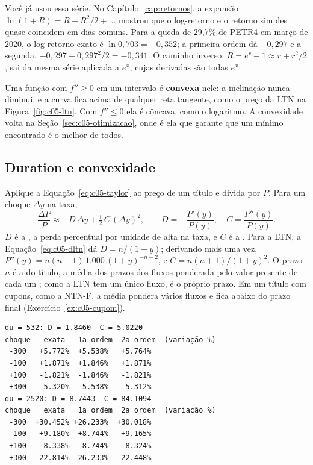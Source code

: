 Você já usou essa série. No Capítulo~\ref{cap:retornos}, a expansão $\ln(1+R) = R - R^2/2 + \dots$ mostrou que o log-retorno e o retorno simples quase coincidem em dias comuns. Para a queda de 29,7\% de PETR4 em março de 2020, o log-retorno exato é $\ln 0,703 = -0,352$; a primeira ordem dá $-0,297$ e a segunda, $-0,297 - 0,297^2/2 = -0,341$. O caminho inverso, $R = e^{r} - 1 \approx r + r^2/2$, sai da mesma série aplicada a $e^{x}$, cujas derivadas são todas $e^{x}$.

Uma função com $f'' \ge 0$ em um intervalo é \textbf{convexa} nele: a inclinação nunca diminui, e a curva fica acima de qualquer reta tangente, como o preço da LTN na Figura~\ref{fig:c05-ltn}. Com $f'' \le 0$ ela é côncava, como o logaritmo. A convexidade volta na Seção~\ref{sec:c05-otimizacao}, onde é ela que garante que um mínimo encontrado é o melhor de todos.

\subsection{Duration e convexidade}
\label{sec:c05-duration}

Aplique a Equação~\eqref{eq:c05-taylor} ao preço de um título e divida por $P$. Para um choque $\Delta y$ na taxa,
\begin{equation}
  \frac{\Delta P}{P} \approx -D\,\Delta y + \tfrac12\,C\,(\Delta y)^2 ,
  \qquad
  D = -\frac{P'(y)}{P(y)} , \quad C = \frac{P''(y)}{P(y)} .
  \label{eq:c05-dur-conv}
\end{equation}
$D$ é a , a perda percentual por unidade de alta na taxa, e $C$ é a . Para a LTN, a Equação~\eqref{eq:c05-dltn} dá $D = n/(1+y)$; derivando mais uma vez, $P''(y) = n(n+1)\,1.000\,(1+y)^{-n-2}$, e $C = n(n+1)/(1+y)^2$. O prazo $n$ é a  do título, a média dos prazos dos fluxos ponderada pelo valor presente de cada um \citep{macaulay1938}; como a LTN tem um único fluxo, é o próprio prazo. Em um título com cupons, como a NTN-F, a média pondera vários fluxos e fica abaixo do prazo final (Exercício~\ref{ex:c05-cupom}).


\begin{lstlisting}[style=saida]
du = 532: D = 1.8460  C = 5.0220
choque   exata   1a ordem  2a ordem  (variação %)
 -300   +5.772%  +5.538%   +5.764%
 -100   +1.871%  +1.846%   +1.871%
 +100   -1.821%  -1.846%   -1.821%
 +300   -5.320%  -5.538%   -5.312%
du = 2520: D = 8.7443  C = 84.1094
choque   exata   1a ordem  2a ordem  (variação %)
 -300  +30.452% +26.233%  +30.018%
 -100   +9.180%  +8.744%   +9.165%
 +100   -8.338%  -8.744%   -8.324%
 +300  -22.814% -26.233%  -22.448%
\end{lstlisting}

